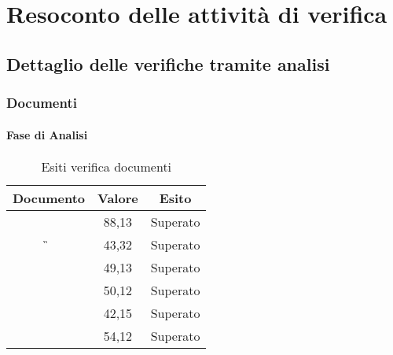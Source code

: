 \newpage
\section{Resoconto delle attività di verifica}

	\subsection{Dettaglio delle verifiche tramite analisi}
	
	\subsubsection{Documenti}
	
	\paragraph{Fase di Analisi}
	
		\begin{table}[H]
			\begin{center}
				\begin{tabular}{|c|c|c|}
					\hline
					\textbf{Documento}&	{\textbf{Valore}} & \textbf{Esito} \\
					\hline
					\AdR		&	88,13	&	Superato	\\
					\hline
					\G			&	43,32	&	Superato	\\
					\hline
					\NdP		&	49,13	&	Superato	\\
					\hline
					\PdP 		&	50,12	&	Superato 	\\
					\hline
					\PdQ 		&	42,15	&	Superato	\\
					\hline
					\SdF		& 	54,12	&	Superato	\\
					\hline
				\end{tabular}
			\end{center}
			\caption{Esiti verifica documenti}
		\end{table}